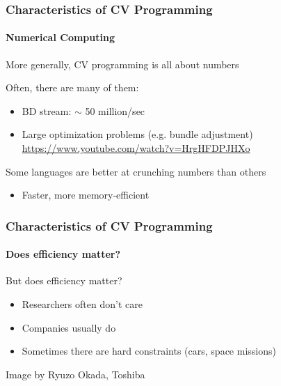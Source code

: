 \documentclass[xetex,professionalfont]{beamer}
\newcommand{\eg}{\mbox{e.g.}\xspace} %
\begin{document}
\begin{frame}
\frametitle{Characteristics of CV Programming}
\framesubtitle{Numerical Computing}

More generally, CV programming is all about numbers

\bigskip
Often, there are many of them:
\begin{itemize}
	\item BD stream: $\sim$ 50 million/sec %
	\item Large optimization problems (\eg bundle adjustment) \\ \url{https://www.youtube.com/watch?v=HrgHFDPJHXo}
\end{itemize}

\bigskip
Some languages are better at crunching numbers than others
\begin{itemize}
	\item Faster, more memory-efficient
\end{itemize}

\end{frame}


\begin{frame}
\frametitle{Characteristics of CV Programming}
\framesubtitle{Does efficiency matter?}

But does efficiency matter?
\begin{itemize}
	\item Researchers often don't care
	\item Companies usually do %
	\item Sometimes there are hard constraints (cars, space missions)
\end{itemize}

\medskip
\begin{center}
	{\centering Image by Ryuzo Okada, Toshiba}
\end{center}

\end{frame}

\end{document}
